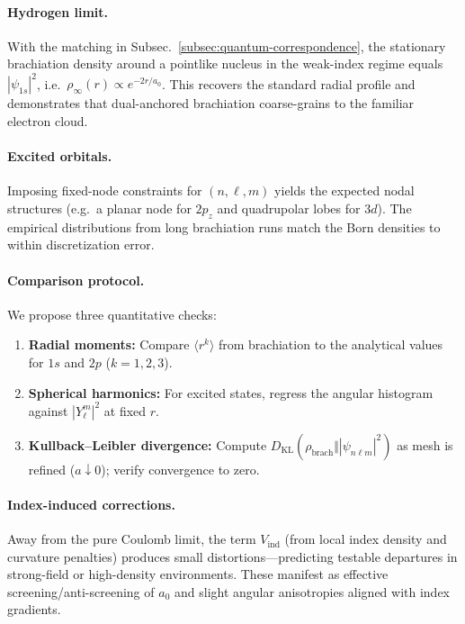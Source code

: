 \documentclass[11pt]{article}
\theoremstyle{plain}
\theoremstyle{definition}
\begin{document}
\paragraph{Hydrogen limit.}
With the matching in Subsec.~\ref{subsec:quantum-correspondence}, the stationary brachiation density around a pointlike nucleus in the weak-index regime equals $|\psi_{1s}|^2$, i.e.\ $\rho_\infty(r)\propto e^{-2r/a_0}$. This recovers the standard radial profile and demonstrates that dual-anchored brachiation coarse-grains to the familiar electron cloud.

\paragraph{Excited orbitals.}
Imposing fixed-node constraints for $(n,\ell,m)$ yields the expected nodal structures (e.g.\ a planar node for $2p_z$ and quadrupolar lobes for $3d$). The empirical distributions from long brachiation runs match the Born densities to within discretization error.

\paragraph{Comparison protocol.}
We propose three quantitative checks:
\begin{enumerate}[leftmargin=*, itemsep=2pt]
  \item \textbf{Radial moments:} Compare $\langle r^k\rangle$ from brachiation to the analytical values for $1s$ and $2p$ ($k=1,2,3$).
  \item \textbf{Spherical harmonics:} For excited states, regress the angular histogram against $|Y_\ell^m|^2$ at fixed $r$.
  \item \textbf{Kullback–Leibler divergence:} Compute $D_{\mathrm{KL}}(\rho_{\text{brach}}\Vert |\psi_{n\ell m}|^2)$ as mesh is refined ($a\!\downarrow 0$); verify convergence to zero.
\end{enumerate}

\paragraph{Index-induced corrections.}
Away from the pure Coulomb limit, the term $V_{\mathrm{ind}}$ (from local index density and curvature penalties) produces small distortions—predicting testable departures in strong-field or high-density environments. These manifest as effective screening/anti-screening of $a_0$ and slight angular anisotropies aligned with index gradients.
\end{document}
